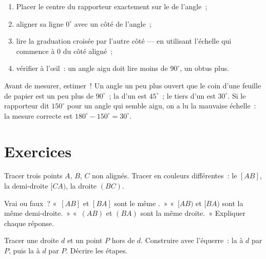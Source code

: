 \begin{method}\label{met:g6:lines:protractor}
\begin{enumerate}
  \item Placer le centre du rapporteur exactement sur le  de
        l'angle~;
  \item aligner sa ligne $0^\circ$ avec un côté de l'angle~;
  \item lire la graduation croisée par l'autre côté --- en utilisant
        l'échelle qui commence à $0$ du côté aligné~;
  \item vérifier à l'œil~: un angle aigu doit lire moins de
        $90^\circ$, un obtus plus.
\end{enumerate}
\end{method}

\begin{example}\label{ex:g6:lines:estimate}
Avant de mesurer, estimer~! Un angle un peu plus ouvert que le coin
d'une feuille de papier est un peu plus de $90^\circ$~; la  d'un
 est $45^\circ$~; le tiers d'un  est $30^\circ$.
Si le rapporteur dit $150^\circ$ pour un angle qui semble aigu, on a
lu la mauvaise échelle~: la mesure correcte est
$180^\circ - 150^\circ = 30^\circ$.
\end{example}

\section{Exercices}

\begin{exercise}[$\star$]\label{exo:g6:lines:1}
Tracer trois points $A$, $B$, $C$ non alignés. Tracer en couleurs
différentes~: le  $[AB]$, la demi-droite $[CA)$, la droite
$(BC)$.
\end{exercise}

\begin{exercise}[$\star$]\label{exo:g6:lines:2}
Vrai ou faux~? «~$[AB]$ et $[BA]$ sont le même .~»
«~$[AB)$ et $[BA)$ sont la même demi-droite.~» «~$(AB)$ et $(BA)$
sont la même droite.~» Expliquer chaque réponse.
\end{exercise}

\begin{exercise}[$\star$]\label{exo:g6:lines:3}
Tracer une droite $d$ et un point $P$ hors de $d$. Construire avec
l'équerre~: la  à $d$ par $P$, puis la  à $d$
par $P$. Décrire les étapes.
\end{exercise}


